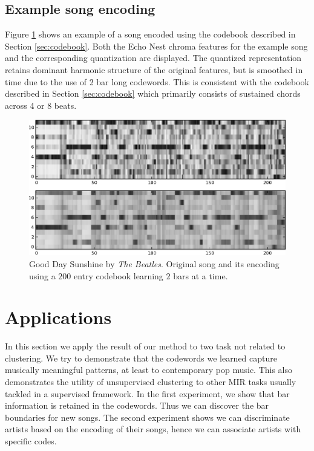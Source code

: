 \documentclass{article}
\begin{document}
\subsection{Example song encoding}

Figure \ref{fig:encodesong} shows an example of a song encoded
using the codebook described in Section \ref{sec:codebook}.  Both the
Echo Nest chroma features for the example song and the corresponding
quantization are displayed.  The quantized representation retains
dominant harmonic structure of the original features, but is smoothed
in time due to the use of 2 bar long codewords.
%
This is consistent with the codebook described in Section
\ref{sec:codebook} which primarily consists of sustained chords across
4 or 8 beats.

\begin{figure}[htb]
\begin{center}
\includegraphics[width=.9\columnwidth]{song_encoded}
\end{center}
\caption{\small{Good Day Sunshine by \textit{The Beatles}.
Original song and its encoding using a $200$ entry codebook learning
$2$ bars at a time.
}}
\label{fig:encodesong}
\end{figure}


\section{Applications}\label{sec:exps2}
In this section we apply the result of our method to two task
not related to clustering. We try to demonstrate that the codewords
we learned capture musically meaningful patterns, at least to
contemporary pop music. This also demonstrates the utility of unsupervised 
clustering to other MIR tasks usually tackled in a supervised
framework. In the first experiment, we show that bar information is retained 
in the codewords. Thus we can discover the bar boundaries for new songs.
The second experiment shows we can discriminate artists
based on the encoding of their songs, hence we can associate artists
with specific codes.
\end{document}
